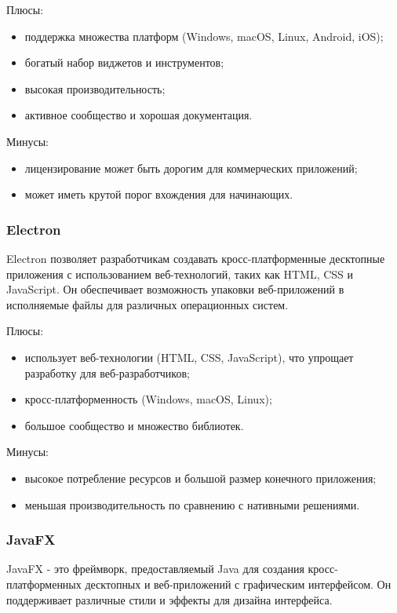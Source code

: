 Плюсы:
\begin{itemize}
\item поддержка множества платформ (Windows, macOS, Linux, Android, iOS);
\item богатый набор виджетов и инструментов;
\item высокая производительность;
\item активное сообщество и хорошая документация.
\end{itemize}

Минусы:
\begin{itemize}
\item лицензирование может быть дорогим для коммерческих приложений;
\item может иметь крутой порог вхождения для начинающих.
\end{itemize}

\subsubsection {Electron}
Electron \cite{electron} позволяет разработчикам создавать кросс-платформенные десктопные приложения с использованием веб-технологий, таких как HTML, CSS и JavaScript. Он обеспечивает возможность упаковки веб-приложений в исполняемые файлы для различных операционных систем.

Плюсы:
\begin{itemize}
\item использует веб-технологии (HTML, CSS, JavaScript), что упрощает разработку для веб-разработчиков;
\item кросс-платформенность (Windows, macOS, Linux);
\item большое сообщество и множество библиотек.
\end{itemize}

Минусы:
\begin{itemize}
\item высокое потребление ресурсов и большой размер конечного приложения;
\item меньшая производительность по сравнению с нативными решениями.
\end{itemize}

\subsubsection {JavaFX}
JavaFX \cite{javafx} - это фреймворк, предоставляемый Java для создания кросс-платформенных десктопных и веб-приложений с графическим интерфейсом. Он поддерживает различные стили и эффекты для дизайна интерфейса.

